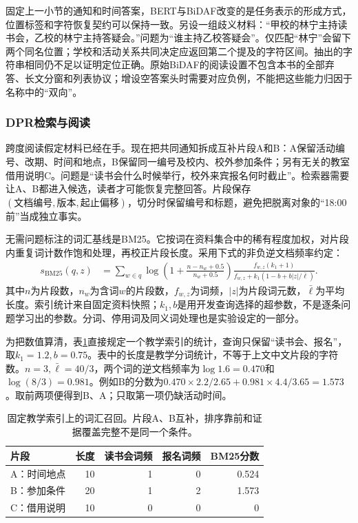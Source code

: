 固定上一小节的通知和时间答案，BERT与BiDAF改变的是任务表示的形成方式，位置标签和字符恢复契约可以保持一致。另设一组歧义材料：“甲校的林宁主持读书会，乙校的林宁主持答疑会。”问题为“谁主持乙校答疑会”。仅匹配“林宁”会留下两个同名位置；学校和活动关系共同决定应返回第二个提及的字符区间。抽出的字符串相同仍不足以证明定位正确。原始BiDAF的阅读设置不包含本书的全部弃答、长文分窗和列表协议；增设空答案头时需要对应负例，不能把这些能力归因于名称中的“双向”。

\subsubsection{DPR检索与阅读}
\label{sec:nlp-dialogue-dpr}

跨度阅读假定材料已经在手。现在把共同通知拆成互补片段A和B：A保留活动编号、改期、时间和地点，B保留同一编号及校内、校外参加条件；另有无关的教室借用说明C。问题是“读书会什么时候举行，校外来宾报名何时截止”。检索器需要让A、B都进入候选，读者才可能恢复完整回答。片段保存$(\text{文档编号},\text{版本},\text{起止偏移})$，切分时保留编号和标题，避免把脱离对象的“18:00前”当成独立事实。

无需问题标注的词汇基线是BM25。它按词在资料集合中的稀有程度加权，对片段内重复词计数作饱和处理，再校正片段长度。采用下式的非负逆文档频率约定：
\begin{equation}
\begin{aligned}
 s_{\mathrm{BM25}}(q,z)
 &=\sum_{w\in q}
 \log\left(1+\frac{n-n_w+0.5}{n_w+0.5}\right)
 \frac{f_{w,z}(k_1+1)}
      {f_{w,z}+k_1(1-b+b|z|/\bar{\ell})}.
\end{aligned}
\label{eq:nlp-dialogue-bm25}
\end{equation}
其中$n$为片段数，$n_w$为含词$w$的片段数，$f_{w,z}$为词频，$|z|$为片段词元数，$\bar{\ell}$为平均长度。索引统计来自固定资料快照；$k_1,b$是用开发查询选择的超参数，不是逐条问题学习出的参数。分词、停用词及同义词处理也是实验设定的一部分。

为把数值算清，表\ref{tab:nlp-dialogue-retrieval}直接规定一个教学索引的统计，查询只保留“读书会、报名”，取$k_1=1.2,b=0.75$。表中的长度是教学分词统计，不等于上文中文片段的字符数。$n=3,\bar{\ell}=40/3$，两个词的逆文档频率为$\log1.6=0.470$和$\log(8/3)=0.981$。例如B的分数为$0.470\times2.2/2.65+0.981\times4.4/3.65=1.573$。取前两项便得到B、A；只取第一项仍缺活动时间。

\begin{table}[htbp]
  \centering
  \begin{tabular}{lrrrr}
    \toprule
    片段 & 长度 & 读书会词频 & 报名词频 & BM25分数\\
    \midrule
    A：时间地点 & 10 & 1 & 0 & 0.524\\
    B：参加条件 & 20 & 1 & 2 & 1.573\\
    C：借用说明 & 10 & 0 & 0 & 0\\
    \bottomrule
  \end{tabular}
  \caption{固定教学索引上的词汇召回。片段A、B互补，排序靠前和证据覆盖完整不是同一个条件。}
  \label{tab:nlp-dialogue-retrieval}
\end{table}

